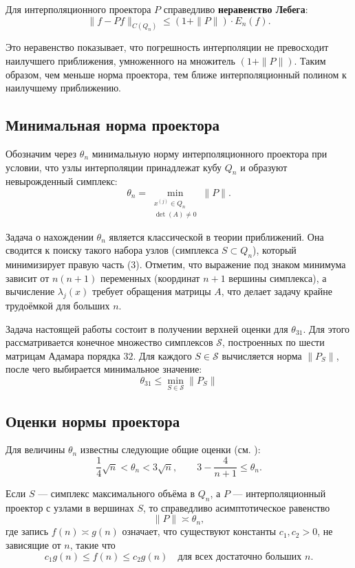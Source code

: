 \documentclass[main]{subfiles}
\begin{document}
Для интерполяционного проектора $P$ справедливо \textbf{неравенство Лебега}:
\[
\|f - P f\|_{C(Q_n)} \le (1 + \|P\|) \cdot E_n(f). \tag{4}
\]

Это неравенство показывает, что погрешность интерполяции не превосходит наилучшего приближения, умноженного на множитель $(1 + \|P\|)$. Таким образом, чем меньше норма проектора, тем ближе интерполяционный полином к наилучшему приближению.

\subsection{Минимальная норма проектора}

Обозначим через $\theta_n$ минимальную норму интерполяционного проектора при условии, что узлы интерполяции принадлежат кубу $Q_n$ и образуют невырожденный симплекс:
\[
\theta_n = \min_{\substack{x^{(j)} \in Q_n \\ \det(A) \neq 0}} \|P\|.
\]
\par
Задача о нахождении $\theta_n$ является классической в теории приближений. Она сводится к поиску такого набора узлов (симплекса $S \subset Q_n$), который минимизирует правую часть (3). Отметим, что выражение под знаком минимума зависит от $n(n+1)$ переменных (координат $n+1$ вершины симплекса), а вычисление $\lambda_j(x)$ требует обращения матрицы $A$, что делает задачу крайне трудоёмкой для больших $n$.
\par
Задача настоящей работы состоит в получении верхней оценки для $\theta_{31}$. Для этого рассматривается конечное множество симплексов $\mathcal{S}$, построенных по шести матрицам Адамара порядка $32$. Для каждого $S \in \mathcal{S}$ вычисляется норма $\|P_S\|$, после чего выбирается минимальное значение:
\[
\theta_{31} \le \min_{S \in \mathcal{S}} \|P_S\|
\]

\subsection{Оценки нормы проектора}

Для величины $\theta_n$ известны следующие общие оценки (см. \cite{nevsky_geo}):
\[
\frac{1}{4}\sqrt{n} < \theta_n < 3\sqrt{n}, \qquad 3 - \frac{4}{n+1} \le \theta_n.
\]

Если $S$ — симплекс максимального объёма в $Q_n$, а $P$ — интерполяционный проектор с узлами в вершинах $S$, то справедливо асимптотическое равенство
\[
\|P\| \asymp \theta_n,
\]
где запись $f(n) \asymp g(n)$ означает, что существуют константы $c_1, c_2 > 0$, не зависящие от $n$, такие что
\[
c_1 g(n) \le f(n) \le c_2 g(n) \quad \text{для всех достаточно больших } n.
\]
\end{document}
